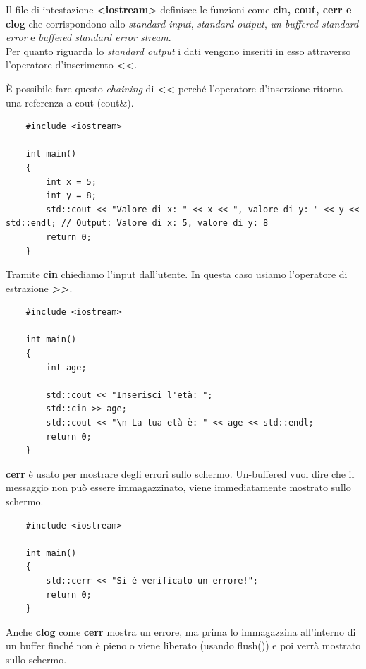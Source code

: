 \textsf{\small Il file di intestazione \textbf{<iostream>} definisce le funzioni come \textbf{cin, cout, cerr e clog} che corrispondono allo \emph{standard input}, \emph{standard output}, \emph{un-buffered standard error} e \emph{buffered standard error stream}.} \\

\textsf{\small Per quanto riguarda lo \emph{standard output} i dati vengono inseriti in esso attraverso l'operatore d'inserimento \textbf{<<}.} \break

\textsf{\small È possibile fare questo \emph{chaining} di \textbf{<<} perché l'operatore d'inserzione ritorna una referenza a cout (cout\&).} \\

\begin{lstlisting}
	#include <iostream>
	
	int main()
	{
		int x = 5;
		int y = 8;
		std::cout << "Valore di x: " << x << ", valore di y: " << y << std::endl; // Output: Valore di x: 5, valore di y: 8
		return 0;
	}
\end{lstlisting}

\textsf{\small Tramite \textbf{cin} chiediamo l'input dall'utente. In questa caso usiamo l'operatore di estrazione \textbf{>>}.} \\

\begin{lstlisting}
	#include <iostream>
	
	int main()
	{
		int age;
		
		std::cout << "Inserisci l'età: ";
		std::cin >> age;
		std::cout << "\n La tua età è: " << age << std::endl;
		return 0;
	}
\end{lstlisting}

\textsf{\small \textbf{cerr} è usato per mostrare degli errori sullo schermo. Un-buffered vuol dire che il messaggio non può essere immagazzinato, viene immediatamente mostrato sullo schermo.} \\

\begin{lstlisting}
	#include <iostream>
	
	int main()
	{
		std::cerr << "Si è verificato un errore!";
		return 0;
	}
\end{lstlisting}

\textsf{\small Anche \textbf{clog} come \textbf{cerr} mostra un errore, ma prima lo immagazzina all'interno di un buffer finché non è pieno o viene liberato (usando flush()) e poi verrà mostrato sullo schermo.} \\

